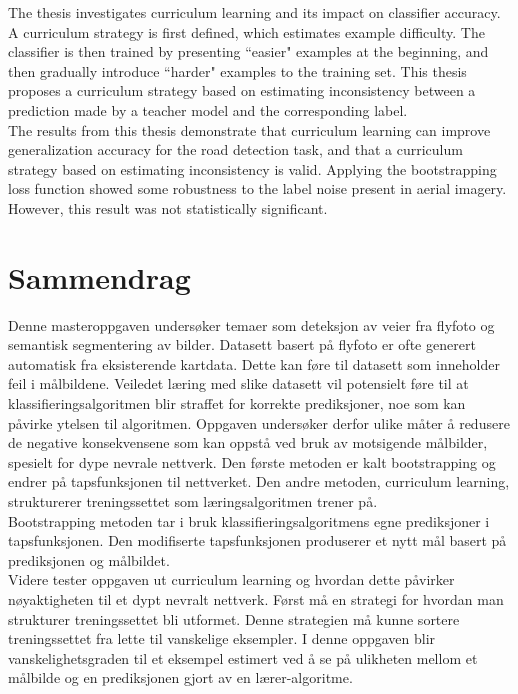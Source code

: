 \documentclass[a4paper]{book}
\begin{document}
The thesis investigates curriculum learning and its impact on classifier accuracy. A curriculum strategy is first defined, which estimates example difficulty. The classifier is then trained by presenting ``easier" examples at the beginning, and then gradually introduce ``harder" examples to the training set. This thesis proposes a curriculum strategy based on estimating inconsistency between a prediction made by a teacher model and the corresponding label.\\

The results from this thesis demonstrate that curriculum learning can improve generalization accuracy for the road detection task, and that a curriculum strategy based on estimating inconsistency is valid. Applying the bootstrapping loss function showed some robustness to the label noise present in aerial imagery. However, this result was not statistically significant.

\clearpage
{} 
\section*{Sammendrag}
Denne masteroppgaven undersøker temaer som deteksjon av veier fra flyfoto og semantisk segmentering av bilder. Datasett basert på flyfoto er ofte generert automatisk fra eksisterende kartdata. Dette kan føre til datasett som inneholder feil i målbildene. Veiledet læring med slike datasett vil potensielt føre til at klassifieringsalgoritmen blir straffet for korrekte prediksjoner, noe som kan påvirke ytelsen til algoritmen. Oppgaven undersøker derfor ulike måter å redusere de negative konsekvensene som kan oppstå ved bruk av motsigende målbilder, spesielt for dype nevrale nettverk. Den første metoden er kalt bootstrapping og endrer på tapsfunksjonen til nettverket. Den andre metoden, curriculum learning, strukturerer treningssettet som læringsalgoritmen trener på.\\

Bootstrapping metoden tar i bruk klassifieringsalgoritmens egne prediksjoner i tapsfunksjonen. Den modifiserte tapsfunksjonen produserer et nytt mål basert på prediksjonen og målbildet.\\

Videre tester oppgaven ut curriculum learning og hvordan dette påvirker nøy\-aktig\-heten til et dypt nevralt nettverk. Først må en strategi for hvordan man strukturer treningssettet bli utformet. Denne strategien  må kunne sortere treningssettet fra lette til vanskelige eksempler. I denne oppgaven blir vanskelighetsgraden til et eksempel estimert ved å se på ulikheten mellom et målbilde og en prediksjonen gjort av en lærer-algoritme.\\
\end{document}
